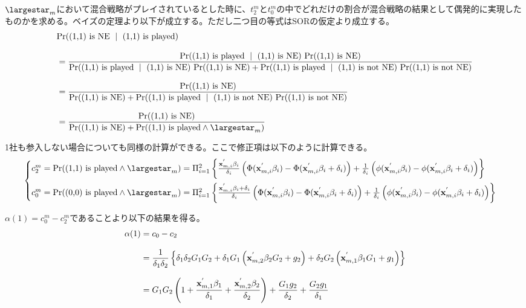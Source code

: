 \documentclass{jsarticle}
\begin{document}
$\largestar_m$において混合戦略がプレイされているとした時に、$t_2^m$と$t_0^m$の中でどれだけの割合が混合戦略の結果として偶発的に実現したものかを求める。ベイズの定理より以下が成立する。ただし二つ目の等式はSORの仮定より成立する。
\begin{align*}
	&{\rm Pr}(\text{(1,1) is NE}\ \mid\ \text{(1,1) is played}) \\[8pt]
	&= \frac{{\rm Pr}(\text{(1,1) is played}\ \mid\ \text{(1,1) is NE})\ {\rm Pr}(\text{(1,1) is NE})}{{\rm Pr}(\text{(1,1) is played}\ \mid\ \text{(1,1) is NE})\ {\rm Pr}(\text{(1,1) is NE}) + {\rm Pr}(\text{(1,1) is played}\ \mid\ \text{(1,1) is not NE})\ {\rm Pr}(\text{(1,1) is not NE})}\\[8pt]
	&= \frac{{\rm Pr}(\text{(1,1) is NE})}{{\rm Pr}(\text{(1,1) is NE}) + {\rm Pr}(\text{(1,1) is played}\ \mid\ \text{(1,1) is not NE})\ {\rm Pr}(\text{(1,1) is not NE})}\\[8pt]
	&= \frac{{\rm Pr}(\text{(1,1) is NE})}{{\rm Pr}(\text{(1,1) is NE}) + {\rm Pr}(\text{(1,1) is played} \wedge \largestar_m)}
\end{align*}

1社も参入しない場合についても同様の計算ができる。ここで修正項は以下のように計算できる。
\begin{align*}
\begin{cases}
	c_2^m = {\rm Pr}(\text{(1,1) is played} \wedge \largestar_m) = \Pi_{i = 1}^2 \left\{ \frac{{\bf x}_{m, i}^{'} \beta_i }{\delta_i} \left( \Phi({\bf x}_{m, i}^{'} \beta_i) - \Phi({\bf x}_{m, i}^{'} \beta_i  + \delta_i) \right) + \frac{1}{\delta_i} \left( \phi({\bf x}_{m, i}^{'} \beta_i ) - \phi({\bf x}_{m, i}^{'} \beta_i  + \delta_i) \right) \right\}\\[10pt]
	c_0^m = {\rm Pr}(\text{(0,0) is played} \wedge \largestar_m) = \Pi_{i = 1}^2 \left\{ \frac{{\bf x}_{m, i}^{'} \beta_i +\delta_i}{\delta_i} \left( \Phi({\bf x}_{m, i}^{'} \beta_i) - \Phi({\bf x}_{m, i}^{'} \beta_i  + \delta_i) \right) + \frac{1}{\delta_i} \left( \phi({\bf x}_{m, i}^{'} \beta_i ) - \phi({\bf x}_{m, i}^{'} \beta_i  + \delta_i) \right) \right\}
\end{cases}
\end{align*}

$\alpha(1) = c_0^m - c_2^m$であることより以下の結果を得る。
\begin{align*}
	\alpha(1) &= c_0 -c_2\\[8pt] &= \frac{1}{\delta_1 \delta_2}\left\{ \delta_1 \delta_2 G_1 G_2 + \delta_1 G_1 \left( {\bf x}_{m, 2}^{'} \beta_2 G_2 + g_2 \right) + \delta_2 G_2 \left( {\bf x}_{m, 1}^{'} \beta_1 G_1 + g_1 \right) \right\}\\[8pt]
	&= G_1 G_2 \left( 1 + \frac{{\bf x}_{m, 1}^{'} \beta_1}{\delta_1} + \frac{{\bf x}_{m, 2}^{'} \beta_2}{\delta_2} \right) + \frac{G_1g_2}{\delta_2} + \frac{G_2g_1}{\delta_1}
\end{align*}
\end{document}
